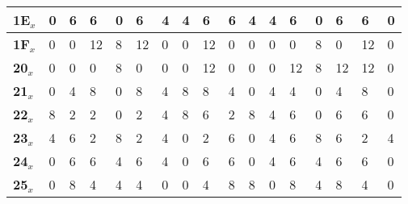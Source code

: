 \begin{longtable}[c]{|l|l|l|l|l|l|l|l|l|l|l|l|l|l|l|l|l|}
\textbf{1E$_x$} & 0              & 6              & 6              & 0              & 6              & 4              & 4              & 6              & 6              & 4              & 4              & 6              & 0              & 6              & 6              & 0              \\ \hline
\textbf{1F$_x$} & 0              & 0              & 12             & 8              & 12             & 0              & 0              & 12             & 0              & 0              & 0              & 0              & 8              & 0              & 12             & 0              \\ \hline
\textbf{20$_x$} & 0              & 0              & 0              & 8              & 0              & 0              & 0              & 12             & 0              & 0              & 0              & 12             & 8              & 12             & 12             & 0              \\ \hline
\textbf{21$_x$} & 0              & 4              & 8              & 0              & 8              & 4              & 8              & 8              & 4              & 0              & 4              & 4              & 0              & 4              & 8              & 0              \\ \hline
\textbf{22$_x$} & 8              & 2              & 2              & 0              & 2              & 4              & 8              & 6              & 2              & 8              & 4              & 6              & 0              & 6              & 6              & 0              \\ \hline
\textbf{23$_x$} & 4              & 6              & 2              & 8              & 2              & 4              & 0              & 2              & 6              & 0              & 4              & 6              & 8              & 6              & 2              & 4              \\ \hline
\textbf{24$_x$} & 0              & 6              & 6              & 4              & 6              & 4              & 0              & 6              & 6              & 0              & 4              & 6              & 4              & 6              & 6              & 0              \\ \hline
\textbf{25$_x$} & 0              & 8              & 4              & 4              & 4              & 0              & 0              & 4              & 8              & 8              & 0              & 8              & 4              & 8              & 4              & 0              \\ \hline

\end{longtable}
